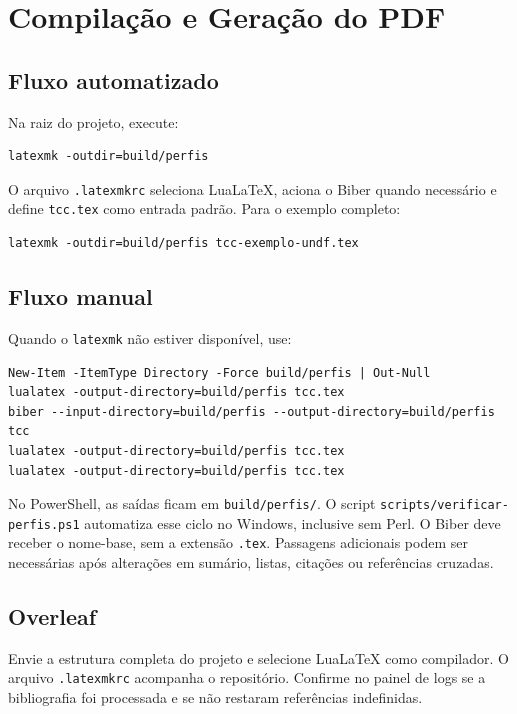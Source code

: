 \chapter{Compilação e Geração do PDF}

\section{Fluxo automatizado}

Na raiz do projeto, execute:

\begin{lstlisting}
latexmk -outdir=build/perfis
\end{lstlisting}

O arquivo \texttt{.latexmkrc} seleciona LuaLaTeX, aciona o Biber quando necessário e define \texttt{tcc.tex} como entrada padrão. Para o exemplo completo:

\begin{lstlisting}
latexmk -outdir=build/perfis tcc-exemplo-undf.tex
\end{lstlisting}

\section{Fluxo manual}

Quando o \texttt{latexmk} não estiver disponível, use:

\begin{lstlisting}
New-Item -ItemType Directory -Force build/perfis | Out-Null
lualatex -output-directory=build/perfis tcc.tex
biber --input-directory=build/perfis --output-directory=build/perfis tcc
lualatex -output-directory=build/perfis tcc.tex
lualatex -output-directory=build/perfis tcc.tex
\end{lstlisting}

No PowerShell, as saídas ficam em \texttt{build/perfis/}. O script
\texttt{scripts/verificar-perfis.ps1} automatiza esse ciclo no Windows, inclusive
sem Perl. O Biber deve receber o nome-base, sem a extensão \texttt{.tex}.
Passagens adicionais podem ser necessárias após alterações em sumário, listas,
citações ou referências cruzadas.

\section{Overleaf}

Envie a estrutura completa do projeto e selecione LuaLaTeX como compilador. O arquivo \texttt{.latexmkrc} acompanha o repositório. Confirme no painel de logs se a bibliografia foi processada e se não restaram referências indefinidas.

